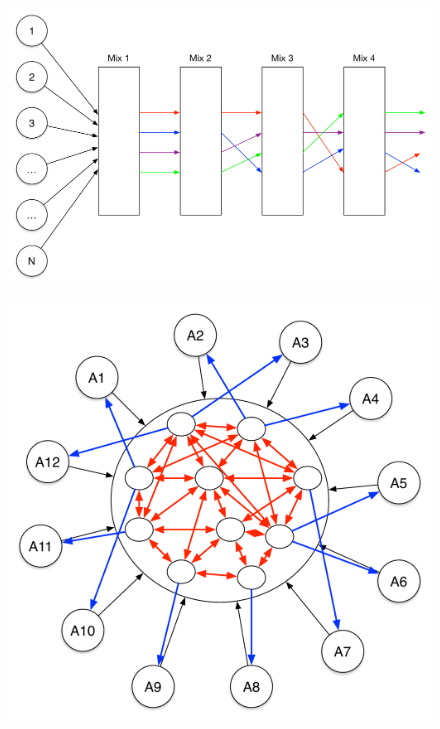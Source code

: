 \begin{figure}
\begin{center}
\includegraphics[scale=0.35]{images/mix_design.pdf}
\label{TODO.}
\label{fig:mix-design}
\end{center}
\end{figure}

\begin{figure}
\begin{center}
\includegraphics[scale=0.35]{images/mix_bitcoin.pdf}
\label{TODO.}
\label{fig:mix-design}
\end{center}
\end{figure}

